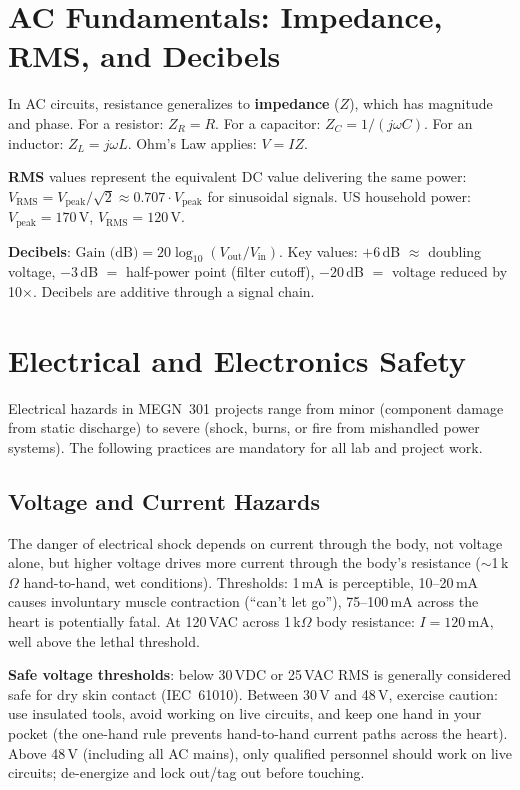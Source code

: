 \documentclass[11pt,letterpaper,twoside,openany]{book}
\begin{document}
\section{AC Fundamentals: Impedance, RMS, and Decibels}

In AC circuits, resistance generalizes to \textbf{impedance} ($Z$), which has magnitude and phase. For a resistor: $Z_R = R$. For a capacitor: $Z_C = 1/(j\omega C)$. For an inductor: $Z_L = j\omega L$. Ohm's Law applies: $V = IZ$.

\textbf{RMS} values represent the equivalent DC value delivering the same power: $V_{\text{RMS}} = V_{\text{peak}}/\sqrt{2} \approx 0.707 \cdot V_{\text{peak}}$ for sinusoidal signals. US household power: $V_{\text{peak}} = 170$\,V, $V_{\text{RMS}} = 120$\,V.

\textbf{Decibels}: $\text{Gain (dB)} = 20\log_{10}(V_{\text{out}}/V_{\text{in}})$. Key values: $+6$\,dB $\approx$ doubling voltage, $-3$\,dB $=$ half-power point (filter cutoff), $-20$\,dB $=$ voltage reduced by 10$\times$. Decibels are additive through a signal chain.


\section{Electrical and Electronics Safety}

Electrical hazards in MEGN~301 projects range from minor (component damage from static discharge) to severe (shock, burns, or fire from mishandled power systems). The following practices are mandatory for all lab and project work.

\subsection{Voltage and Current Hazards}
The danger of electrical shock depends on current through the body, not voltage alone, but higher voltage drives more current through the body's resistance ($\sim$1\,k$\Omega$ hand-to-hand, wet conditions). Thresholds: 1\,mA is perceptible, 10--20\,mA causes involuntary muscle contraction (``can't let go''), 75--100\,mA across the heart is potentially fatal. At 120\,VAC across 1\,k$\Omega$ body resistance: $I = 120$\,mA, well above the lethal threshold.

\textbf{Safe voltage thresholds}: below 30\,VDC or 25\,VAC RMS is generally considered safe for dry skin contact (IEC~61010). Between 30\,V and 48\,V, exercise caution: use insulated tools, avoid working on live circuits, and keep one hand in your pocket (the one-hand rule prevents hand-to-hand current paths across the heart). Above 48\,V (including all AC mains), only qualified personnel should work on live circuits; de-energize and lock out/tag out before touching.
\end{document}
